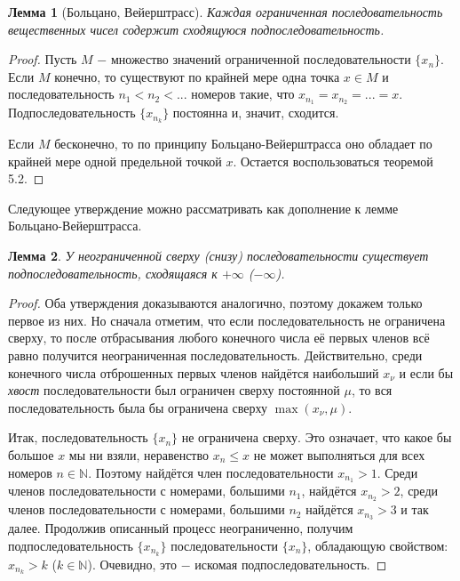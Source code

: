 \documentclass{article}
\newtheorem*{lemma}{Лемма}
\begin{document}
\begin{lemma}[Больцано, Вейерштрасс]
Каждая ограниченная последовательность вещественных чисел содержит сходящуюся подпоследовательность.
\end{lemma}

\begin{proof}
Пусть \(M\) \(-\) множество значений ограниченной последовательности \(\{x_n\}\). Если \(M\) конечно, то существуют по крайней мере одна точка \(x \in M\) и последовательность \(n_1 < n_2 < ...\) номеров такие, что \(x_{n_1} = x_{n_2} = ... = x\). Подпоследовательность \(\{x_{n_k}\}\) постоянна и, значит, сходится.

Если \(M\) бесконечно, то по принципу Больцано-Вейерштрасса оно обладает по крайней мере одной предельной точкой \(x\). Остается воспользоваться теоремой 5.2.
\end{proof}

Следующее утверждение можно рассматривать как дополнение к лемме Больцано-Вейерштрасса.

\begin{lemma}
У неограниченной сверху (снизу) последовательности существует подпоследовательность, сходящаяся к \(+ \infty\) (\(- \infty\)).
\end{lemma}

\begin{proof}
Оба утверждения доказываются аналогично, поэтому докажем только первое из них. Но сначала отметим, что если последовательность не ограничена сверху, то после отбрасывания любого конечного числа её первых членов всё равно получится неограниченная последовательность. Действительно, среди конечного числа отброшенных первых членов найдётся наибольший \(x_\nu\) и если бы \textit{хвост} последовательности был ограничен сверху постоянной \(\mu\), то вся последовательность была бы ограничена сверху \(\max(x_\nu, \mu)\).

Итак, последовательность \(\{x_n\}\) не ограничена сверху. Это означает, что какое бы большое \(x\) мы ни взяли, неравенство \(x_n \leq x\) не может выполняться для всех номеров \(n \in \mathbb{N}\). Поэтому найдётся член последовательности \(x_{n_1} > 1\). Среди членов последовательности с номерами, большими \(n_1\), найдётся \(x_{n_2} > 2\), среди членов последовательности с номерами, большими \(n_2\) найдётся \(x_{n_3} > 3\) и так далее. Продолжив описанный процесс неограниченно, получим подпоследовательность \(\{x_{n_k}\}\) последовательности \(\{x_n\}\), обладающую свойством: \(x_{n_k} > k\) (\(k \in \mathbb{N}\)). Очевидно, это \(-\) искомая подпоследовательность.
\end{proof}
\end{document}
